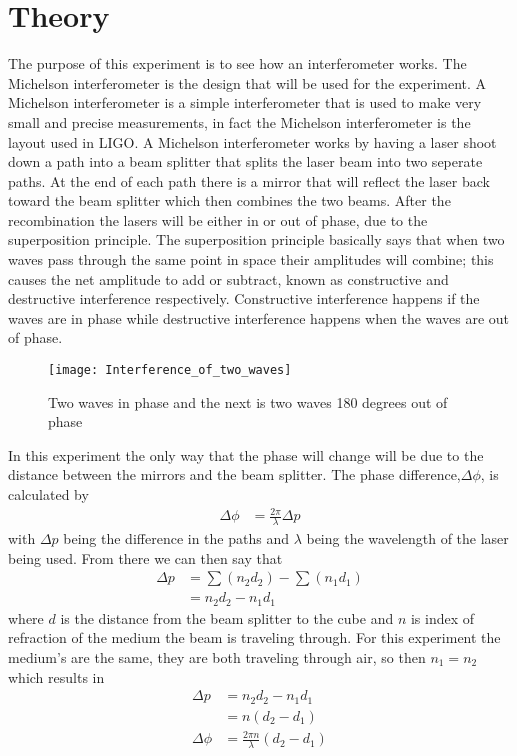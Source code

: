 \section{Theory}

The purpose of this experiment is to see how an interferometer works. The
Michelson interferometer is the design that will be used for the experiment. A
Michelson interferometer is a simple interferometer that is used to make very
small and precise measurements, in fact the Michelson interferometer is the
layout used in LIGO\@. A Michelson interferometer works by having a laser shoot
down a path into a beam splitter that splits the laser beam into two seperate
paths. At the end of each path there is a mirror that will reflect the laser
back toward the beam splitter which then combines the two beams. After the
recombination the lasers will be either in or out of phase, due to the
superposition principle. The superposition principle basically says that when
two waves pass through the same point in space their amplitudes will combine;
this causes the net amplitude to add or subtract, known as constructive and
destructive interference respectively. Constructive interference happens if the
waves are in phase while destructive interference happens when the waves are out
of phase.

\begin{figure}[ht!]
\centering
\texttt{[image: Interference\_of\_two\_waves]}
\caption{Two waves in phase and the next is two waves 180 degrees out of phase}
\end{figure}

In this experiment the only way that the phase will change will be due to the distance between the mirrors and the beam splitter. The phase difference,$\Delta \phi$, is calculated by 
	\begin{align}
		\nonumber \Delta \phi &=\frac{2\pi}{\lambda} \Delta p
	\end{align}
with $\Delta p$ being the difference in the paths and $\lambda$ being the wavelength of the laser being used. From there we can then say that 
	\begin{align}
		\nonumber \Delta p &=\sum(n_2 d_2)-\sum(n_1 d_1) \\
		\nonumber		&=n_2 d_2 - n_1 d_1
	\end{align} 
where $d$ is the distance from the beam splitter to the cube and $n$ is index of refraction of the medium the beam is traveling through. For this experiment the medium's are the same, they are both traveling through air, so then $n_1=n_2$ which results in
	\begin{align}
		\nonumber \Delta p &= n_2 d_2 - n_1 d_1 \\
		\nonumber 	&= n(d_2 - d_1) \\
		\nonumber \Delta \phi &=\frac{2\pi n}{\lambda} (d_2 - d_1)
	\end{align}

